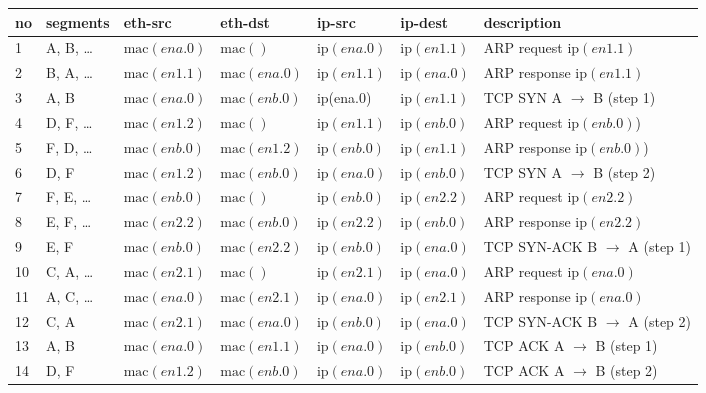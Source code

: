 \documentclass[a4paper,10pt]{article}
\begin{document}
\begin{tabular}{ l | l | l | l | l | l | l }
  no & segments & eth-src & eth-dst & ip-src & ip-dest & description \\\hline

  1 & A, B, \dots & $\text{mac}(ena.0)$ & $\text{mac}()$ & $\text{ip}(ena.0)$ & $\text{ip}(en1.1)$ & ARP request $\text{ip}(en1.1)$  \\
  2 & B, A, \dots & $\text{mac}(en1.1)$ & $\text{mac}(ena.0)$ & $\text{ip}(en1.1)$ & $\text{ip}(ena.0)$ & ARP response $\text{ip}(en1.1)$  \\
  3 & A, B & $\text{mac}(ena.0)$ & $\text{mac}(enb.0)$ & ip(ena.0) & $\text{ip}(en1.1)$ & TCP SYN A $\rightarrow$ B (step 1)\\
  4 & D, F, \dots & $\text{mac}(en1.2)$ & $\text{mac}()$ & $\text{ip}(en1.1)$ & $\text{ip}(enb.0)$ & ARP request $\text{ip}(enb.0)$)  \\
  5 & F, D, \dots & $\text{mac}(enb.0)$ & $\text{mac}(en1.2)$ & $\text{ip}(enb.0)$ & $\text{ip}(en1.1)$ & ARP response $\text{ip}(enb.0)$)  \\
  6 & D, F & $\text{mac}(en1.2)$ & $\text{mac}(enb.0)$  & $\text{ip}(ena.0)$ & $\text{ip}(enb.0)$ & TCP SYN A $\rightarrow$ B (step 2)\\\hline

  7 & F, E, \dots & $\text{mac}(enb.0)$ & $\text{mac}()$ & $\text{ip}(enb.0)$ & $\text{ip}(en2.2)$ & ARP request $\text{ip}(en2.2)$  \\
  8 & E, F, \dots & $\text{mac}(en2.2)$ & $\text{mac}(enb.0)$ & $\text{ip}(en2.2)$ & $\text{ip}(enb.0)$ & ARP response $\text{ip}(en2.2)$  \\
  9 & E, F & $\text{mac}(enb.0)$ & $\text{mac}(en2.2)$ & $\text{ip}(enb.0)$ & $\text{ip}(ena.0)$ & TCP SYN-ACK B $\rightarrow$ A (step 1)  \\
  10 & C, A, \dots & $\text{mac}(en2.1)$ & $\text{mac}()$ & $\text{ip}(en2.1)$ & $\text{ip}(ena.0)$ & ARP request $\text{ip}(ena.0)$ \\
  11 & A, C, \dots & $\text{mac}(ena.0)$ & $\text{mac}(en2.1)$ & $\text{ip}(ena.0)$ & $\text{ip}(en2.1)$ & ARP response $\text{ip}(ena.0)$  \\
  12 & C, A & $\text{mac}(en2.1)$ & $\text{mac}(ena.0)$ & $\text{ip}(enb.0)$ & $\text{ip}(ena.0)$ & TCP SYN-ACK B $\rightarrow$ A (step 2) \\\hline

  13 & A, B & $\text{mac}(ena.0)$ & $\text{mac}(en1.1)$ & $\text{ip}(ena.0)$ & $\text{ip}(enb.0)$ & TCP ACK A $\rightarrow$ B (step 1)\\
  14 & D, F & $\text{mac}(en1.2)$ & $\text{mac}(enb.0)$  & $\text{ip}(ena.0)$ & $\text{ip}(enb.0)$ & TCP ACK A $\rightarrow$ B (step 2)\\\hline

  \hline
\end{tabular}
\end{document}
